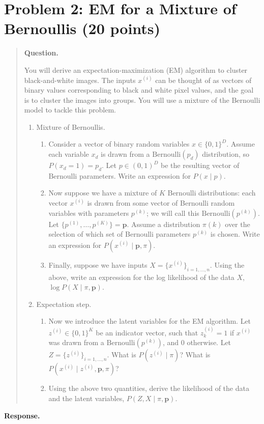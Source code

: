 \documentclass[11pt]{article}
\newenvironment{question}{%
  \par\addvspace{0.8em}%
  \begin{quote}\small
  \noindent\textbf{Question.}\enspace\ignorespaces
}{%
  \end{quote}%
  \par\nopagebreak
  \noindent\textbf{Response.}\par\nopagebreak\smallskip
}
\begin{document}
\section{Problem 2: EM for a Mixture of Bernoullis (20 points)}

\begin{question}
You will derive an expectation-maximization (EM) algorithm to cluster black-and-white images. The inputs \(x^{(i)}\) can be thought of as vectors of binary values corresponding to black and white pixel values, and the goal is to cluster the images into groups. You will use a mixture of the Bernoulli model to tackle this problem.
\begin{enumerate}
  \item[(a)] Mixture of Bernoullis.
  \begin{enumerate}
    \item[(i)] Consider a vector of binary random variables \(x\in\{0,1\}^D\). Assume each variable \(x_d\) is drawn from a \(\mathrm{Bernoulli}(p_d)\) distribution, so \(P(x_d=1)=p_d\). Let \(p\in(0,1)^D\) be the resulting vector of Bernoulli parameters. Write an expression for \(P(x\mid p)\).
    \item[(ii)] Now suppose we have a mixture of \(K\) Bernoulli distributions: each vector \(x^{(i)}\) is drawn from some vector of Bernoulli random variables with parameters \(p^{(k)}\); we will call this \(\mathrm{Bernoulli}(p^{(k)})\). Let \(\{p^{(1)},\ldots,p^{(K)}\}=\mathbf{p}\). Assume a distribution \(\pi(k)\) over the selection of which set of Bernoulli parameters \(p^{(k)}\) is chosen. Write an expression for \(P(x^{(i)}\mid\mathbf{p},\pi)\).
    \item[(iii)] Finally, suppose we have inputs \(X=\{x^{(i)}\}_{i=1,\ldots,n}\). Using the above, write an expression for the log likelihood of the data \(X\), \(\log P(X\mid\pi,\mathbf{p})\).
  \end{enumerate}
  \item[(b)] Expectation step.
  \begin{enumerate}
    \item[(i)] Now we introduce the latent variables for the EM algorithm. Let \(z^{(i)}\in\{0,1\}^K\) be an indicator vector, such that \(z^{(i)}_k=1\) if \(x^{(i)}\) was drawn from a \(\mathrm{Bernoulli}(p^{(k)})\), and \(0\) otherwise. Let \(Z=\{z^{(i)}\}_{i=1,\ldots,n}\). What is \(P(z^{(i)}\mid\pi)\)? What is \(P(x^{(i)}\mid z^{(i)},\mathbf{p},\pi)\)?
    \item[(ii)] Using the above two quantities, derive the likelihood of the data and the latent variables, \(P(Z,X\mid\pi,\mathbf{p})\).

\end{enumerate}
\end{enumerate}
\end{question}
\end{document}
